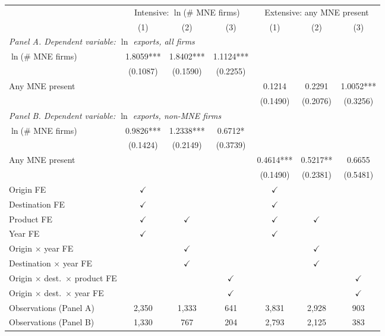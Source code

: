 \begin{tabular}{lcccccc} \hline
 & \multicolumn{3}{c}{Intensive: $\ln$(\# MNE firms)} & \multicolumn{3}{c}{Extensive: any MNE present} \\
 & (1) & (2) & (3) & (1) & (2) & (3) \\ \hline
\multicolumn{7}{l}{\textit{Panel A. Dependent variable: $\ln$ exports, all firms}} \\
$\ln$(\# MNE firms) & 1.8059*** & 1.8402*** & 1.1124*** &  &  &  \\
 & (0.1087) & (0.1590) & (0.2255) &  &  &  \\
Any MNE present &  &  &  & 0.1214 & 0.2291 & 1.0052*** \\
 &  &  &  & (0.1490) & (0.2076) & (0.3256) \\
\midrule
\multicolumn{7}{l}{\textit{Panel B. Dependent variable: $\ln$ exports, non-MNE firms}} \\
$\ln$(\# MNE firms) & 0.9826*** & 1.2338*** & 0.6712* &  &  &  \\
 & (0.1424) & (0.2149) & (0.3739) &  &  &  \\
Any MNE present &  &  &  & 0.4614*** & 0.5217** & 0.6655 \\
 &  &  &  & (0.1490) & (0.2381) & (0.5481) \\
\hline
Origin FE & $\checkmark$ &  &  & $\checkmark$ &  &  \\
Destination FE & $\checkmark$ &  &  & $\checkmark$ &  &  \\
Product FE & $\checkmark$ & $\checkmark$ &  & $\checkmark$ & $\checkmark$ &  \\
Year FE & $\checkmark$ &  &  & $\checkmark$ &  &  \\
Origin $\times$ year FE &  & $\checkmark$ &  &  & $\checkmark$ &  \\
Destination $\times$ year FE &  & $\checkmark$ &  &  & $\checkmark$ &  \\
Origin $\times$ dest.\ $\times$ product FE &  &  & $\checkmark$ &  &  & $\checkmark$ \\
Origin $\times$ dest.\ $\times$ year FE &  &  & $\checkmark$ &  &  & $\checkmark$ \\
Observations (Panel A) & 2,350 & 1,333 & 641 & 3,831 & 2,928 & 903 \\
Observations (Panel B) & 1,330 & 767 & 204 & 2,793 & 2,125 & 383 \\
\hline
\end{tabular}

